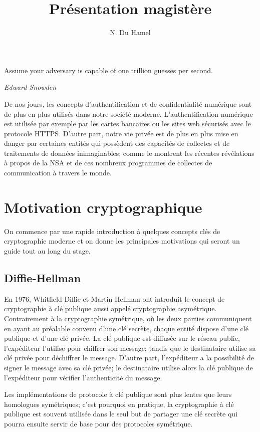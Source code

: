 \documentclass[a4paper]{article}
\theoremstyle{definition}
\theoremstyle{remark}
\numberwithin{equation}{section}
\begin{document}
\title{Présentation magistère}
\author{N. Du Hamel}
\maketitle

\epigraph{Assume your adversary is capable of one trillion guesses per second.}{\textit{Edward Snowden}}

De nos jours, les concepts d'authentification et de confidentialité numérique sont de plus en plus utilisés dans notre société moderne. L'authentification numérique est utilisée par exemple par les cartes bancaires ou les sites web sécurisés avec le protocole HTTPS. D'autre part, notre vie privée est de plus en plus mise en danger par certaines entités qui possèdent des capacités de collectes et de traitements de données inimaginables; comme le montrent les récentes révélations à propos de la NSA et de ces nombreux programmes de collectes de communication à travers le monde.

\section{Motivation cryptographique}

On commence par une rapide introduction à quelques concepts clés de cryptographie moderne et on donne les principales motivations qui seront un guide tout au long du stage.

\subsection{Diffie-Hellman}
En 1976, Whitfield Diffie et Martin Hellman \cite{diffie-hellman} ont introduit le concept de cryptographie à clé publique aussi appelé cryptographie asymétrique. Contrairement à la cryptographie symétrique, où les deux parties communiquent en ayant au préalable convenu d'une clé secrète, chaque entité dispose d'une clé publique et d'une clé privée. La clé publique est diffusée sur le réseau public, l'expéditeur l'utilise pour chiffrer son message; tandis que le destinataire utilise sa clé privée pour déchiffrer le message. D'autre part, l'expéditeur a la possibilité de signer le message avec sa clé privée; le destinataire utilise alors la clé publique de l'expéditeur pour vérifier l'authenticité du message.

Les implémentations de protocole à clé publique sont plus lentes que leurs homologues symétriques; c'est pourquoi en pratique, la cryptographie à clé publique est souvent utilisée dans le seul but de partager une clé secrète qui pourra ensuite servir de base pour des protocoles symétrique.
\end{document}
